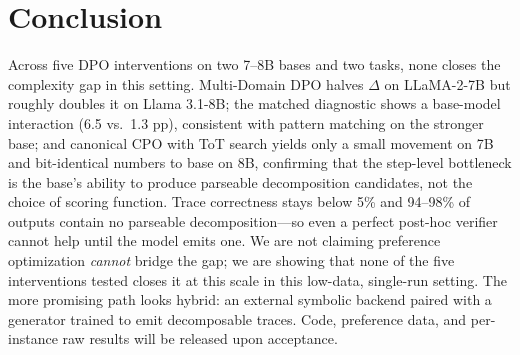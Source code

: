\documentclass{article}
\begin{document}
\section{Conclusion}

Across five DPO interventions on two 7--8B bases and two tasks, none closes the complexity gap in this setting. Multi-Domain DPO halves $\Delta$ on LLaMA-2-7B but roughly doubles it on Llama 3.1-8B; the matched diagnostic shows a base-model interaction (6.5 vs.\ 1.3 pp), consistent with pattern matching on the stronger base; and canonical CPO with ToT search yields only a small movement on 7B and bit-identical numbers to base on 8B, confirming that the step-level bottleneck is the base's ability to produce parseable decomposition candidates, not the choice of scoring function. Trace correctness stays below 5\% and 94--98\% of outputs contain no parseable decomposition---so even a perfect post-hoc verifier cannot help until the model emits one. We are not claiming preference optimization \emph{cannot} bridge the gap; we are showing that none of the five interventions tested closes it at this scale in this low-data, single-run setting. The more promising path looks hybrid: an external symbolic backend paired with a generator trained to emit decomposable traces. Code, preference data, and per-instance raw results will be released upon acceptance.


\end{document}
